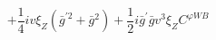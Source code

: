 %
\begin{dmath*}
%
  +  \frac{1}{4} i v \xi_Z \left({\bar g}^{\prime 2} + {\bar g}{}^2\right)  +  \frac{1}{2} i {\bar g}^\prime {\bar g}{} v^3 \xi_ZC^{ \varphi  WB}
%
\end{dmath*}
%
